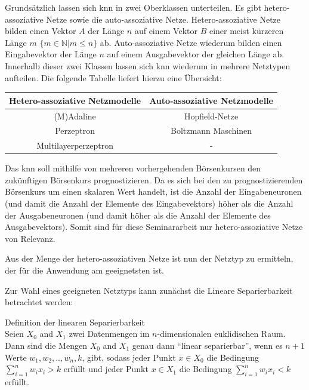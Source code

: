 Grundsätzlich lassen sich \acs{knn} in zwei Oberklassen unterteilen. Es gibt hetero-assoziative Netze sowie die auto-assoziative Netze. Hetero-assoziative Netze bilden einen Vektor $A$ der Länge $n$ auf einem Vektor $B$ einer meist kürzeren Länge $m$ $\{m \in \mathbb{N} | m \le n\}$ ab. Auto-assoziative Netze wiederum bilden einen Eingabevektor der Länge $n$ auf einem Ausgabevektor der gleichen Länge ab. Innerhalb dieser zwei Klassen lassen sich \acs{knn} wiederum in mehrere Netztypen aufteilen. Die folgende Tabelle liefert hierzu eine Übersicht:

\begin{center}
\begin{tabular}{|c|c|}
\hline 
\textbf{Hetero-assoziative Netzmodelle} & \textbf{Auto-assoziative Netzmodelle} \\ 
\hline 
(M)Adaline & Hopfield-Netze \\ 
\hline  
Perzeptron &  Boltzmann Maschinen \\ 
\hline 
Multilayerperzeptron & - \\ 
\hline 
\end{tabular} 
\end{center}

Das \acs{knn} soll mithilfe von mehreren vorhergehenden Börsenkursen den zukünftigen Börsenkurs prognostizieren. Da es sich bei den zu prognostizierenden Börsenkurs um einen skalaren Wert handelt, ist die Anzahl der Eingabeneuronen (und damit die Anzahl der Elemente des Eingabevektors) höher als die Anzahl der Ausgabeneuronen (und damit höher als die Anzahl der Elemente des Ausgabevektors). Somit sind für diese Seminararbeit nur hetero-assoziative Netze von Relevanz.

Aus der Menge der hetero-assoziativen Netze ist nun der Netztyp zu ermitteln, der für die Anwendung am geeignetsten ist.

Zur Wahl eines geeigneten Netztyps kann zunächst die Lineare Separierbarkeit betrachtet werden:

\begin{defi}Definition der linearen Separierbarkeit\\
Seien $X_{0}$ and $X_{1}$ zwei Datenmengen im $n$-dimensionalen euklidischen Raum. Dann sind die Mengen $X_{0}$ and $X_{1}$ genau dann  "`linear separierbar"', wenn es  $n+1$ Werte $w_{1}, w_{2},..,w_{n}, k$, gibt, sodass jeder Punkt  $x \in X_{0}$ die Bedingung $\sum^{n}_{i=1} w_{i}x_{i} > k$ erfüllt und jeder Punkt $x \in X_{1}$ die Bedingung $\sum^{n}_{i=1} w_{i}x_{i} < k$ erfüllt.
\end{defi}

